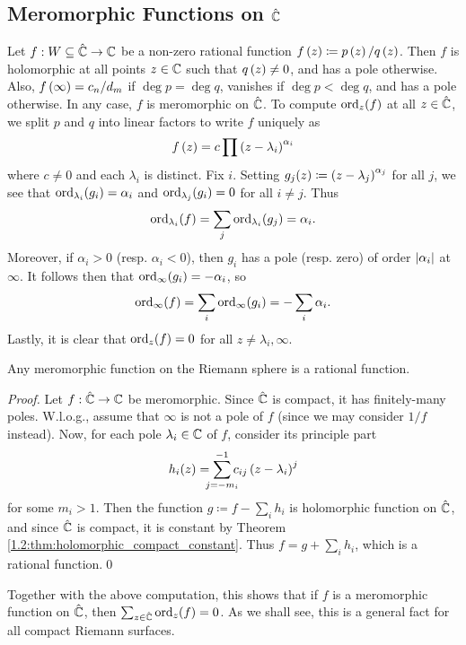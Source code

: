 \documentclass[../Moduli_Spaces_of_Riemann_Surfaces.tex]{subfiles}
\begin{document}
    \subsection{Meromorphic Functions on $\hat{\mathbb{C}}$}
    \begin{example}
        Let $f:W\subseteq\hat{\mathbb{C}}\to\mathbb{C}$ be a non-zero rational function $f\left(z\right)\coloneqq p\left(z\right)/q\left(z\right)$. Then $f$ is holomorphic at all points $z\in\mathbb{C}$ such that $q\left(z\right)\neq0$, and has a pole otherwise. Also, $f\left(\infty\right)=c_n/d_m$ if $\deg p=\deg q$, vanishes if $\deg p<\deg q$, and has a pole otherwise. In any case, $f$ is meromorphic on $\hat{\mathbb{C}}$. To compute $\operatorname{ord}_z\!\left(f\right)$ at all $z\in\hat{\mathbb{C}}$, we split $p$ and $q$ into linear factors to write $f$ uniquely as
        \begin{equation*}
            f\left(z\right)=c\prod\left(z-\lambda_i\right)^{\alpha_i}
        \end{equation*}
        where $c\neq0$ and each $\lambda_i$ is distinct. Fix $i$. Setting $g_j\!\left(z\right)\coloneqq\left(z-\lambda_j\right)^{\alpha_j}$ for all $j$, we see that $\operatorname{ord}_{\lambda_i}\!\left(g_i\right)=\alpha_i$ and $\operatorname{ord}_{\lambda_j}\!\left(g_i\right)=0$ for all $i\neq j$. Thus
        \begin{equation*}
            \operatorname{ord}_{\lambda_i}\!\left(f\right)=\sum_j\operatorname{ord}_{\lambda_i}\!\left(g_j\right)=\alpha_i.
        \end{equation*}
        Moreover, if $\alpha_i>0$ (resp. $\alpha_i<0$), then $g_i$ has a pole (resp. zero) of order $\left|\alpha_i\right|$ at $\infty$. It follows then that $\operatorname{ord}_\infty\!\left(g_i\right)=-\alpha_i$, so
        \begin{equation*}
            \operatorname{ord}_\infty\!\left(f\right)=\sum_i\operatorname{ord}_\infty\!\left(g_i\right)=-\sum_i\alpha_i.
        \end{equation*}
        Lastly, it is clear that $\operatorname{ord}_z\!\left(f\right)=0$ for all $z\neq \lambda_i,\infty$.\exqed
    \end{example}
    \begin{theorem}\label{1.2:thm:meromorphic_Riemann_sphere_rational}
        Any meromorphic function on the Riemann sphere is a rational function.
    \end{theorem}
    \begin{proof}
        Let $f:\hat{\mathbb{C}}\to\mathbb{C}$ be meromorphic. Since $\hat{\mathbb{C}}$ is compact, it has finitely-many poles. W.l.o.g., assume that $\infty$ is not a pole of $f$ (since we may consider $1/f$ instead). Now, for each pole $\lambda_i\in\mathbb{C}$ of $f$, consider its principle part
        \begin{equation*}
            h_i\!\l(z\r)=\sum_{\mathclap{j=-m_i}}^{-1}c_{ij}\l(z-\lambda_i\r)^j
        \end{equation*}
        for some $m_i>1$. Then the function $g\coloneqq f-\sum_ih_i$ is holomorphic function on $\hat{\mathbb{C}}$, and since $\hat{\mathbb{C}}$ is compact, it is constant by Theorem \ref{1.2:thm:holomorphic_compact_constant}. Thus $f=g+\sum_ih_i$, which is a rational function.\qed
    \end{proof}
    \begin{remark}
        Together with the above computation, this shows that if $f$ is a meromorphic function on $\hat{\mathbb{C}}$, then $\sum_{z\in\hat{\mathbb{C}}}\operatorname{ord}_z\!\left(f\right)=0$. As we shall see, this is a general fact for all compact Riemann surfaces.\exqed
    \end{remark}
\end{document}

